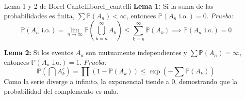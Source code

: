 \documentclass[10pt,a4paper]{article}
\begin{document}
\begin{mytheo}{Lema 1 y 2 de Borel-Cantelli}{borel_cantelli}
\textbf{Lema 1:} Si la suma de las probabilidades es finita, $\sum \mathbb{P}(A_n) < \infty$, entonces $\mathbb{P}(A_n \text{ i.o.}) = 0$.
\textit{Prueba:}
\[ \mathbb{P}(A_n \text{ i.o.}) = \lim_{n \to \infty} \mathbb{P}\left( \bigcup_{k=n}^\infty A_k \right) \le \sum_{k=n}^\infty \mathbb{P}(A_k) \implies \mathbb{P}(A_n \text{ i.o.}) = 0 \]

\textbf{Lema 2:} Si los eventos $A_n$ son mutuamente independientes y $\sum \mathbb{P}(A_n) = \infty$, entonces $\mathbb{P}(A_n \text{ i.o.}) = 1$.
\textit{Prueba:}
\[ \mathbb{P}\left( \bigcap A_k^c \right) = \prod (1 - \mathbb{P}(A_k)) \le \exp\left( -\sum \mathbb{P}(A_k) \right) \]
Como la serie diverge a infinito, la exponencial tiende a 0, demostrando que la probabilidad del complemento es nula.
\end{mytheo}
\end{document}
